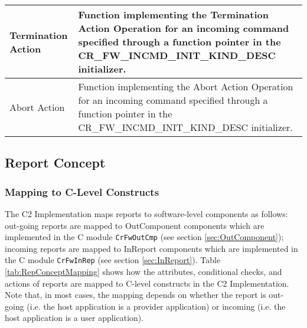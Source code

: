 \documentclass{pnp_article}
\begin{document}
\begin{longtable}{|>{\raggedright}p{2.0cm}|p{11.3cm}|}
\hline
Termination Action & Function implementing the Termination Action Operation for an incoming command specified through a function pointer in the CR\_FW\_INCMD\_INIT\_KIND\_DESC initializer. \\
\hline
Abort Action & Function implementing the Abort Action Operation for an incoming command specified through a function pointer in the CR\_FW\_INCMD\_INIT\_KIND\_DESC initializer. \\
\hline
\end{longtable}


\subsection{Report Concept }\label{sec:RepConcept}


\subsubsection{Mapping to C-Level Constructs}\label{sec:RepConceptMapping}
The C2 Implementation maps reports to software-level components as follows: out-going reports are mapped to OutComponent components which are implemented in the C module \texttt{CrFwOutCmp} (see section \ref{sec:OutComponent}); incoming reports are mapped to InReport components which are implemented in the C module \texttt{CrFwInRep} (see section \ref{sec:InReport}). Table \ref{tab:RepConceptMapping} shows how the attributes, conditional checks, and actions of reports are mapped to C-level constructs in the C2 Implementation. Note that, in most cases, the mapping depends on whether the report is out-going (i.e. the host application is a provider application) or incoming (i.e. the host application is a user application).
\end{document}
